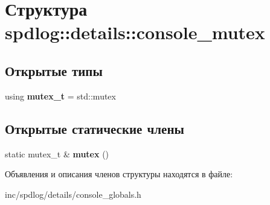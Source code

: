 \hypertarget{structspdlog_1_1details_1_1console__mutex}{}\section{Структура spdlog\+:\+:details\+:\+:console\+\_\+mutex}
\label{structspdlog_1_1details_1_1console__mutex}
\subsection*{Открытые типы}
\begin{DoxyCompactItemize}
\item 
\mbox{\label{structspdlog_1_1details_1_1console__mutex_a8c47cc70b6f1c3c7ddda2f919e4fae53}} 
using {\bfseries mutex\+\_\+t} = std\+::mutex
\end{DoxyCompactItemize}
\subsection*{Открытые статические члены}
\begin{DoxyCompactItemize}
\item 
\mbox{\label{structspdlog_1_1details_1_1console__mutex_a0eca5de786748bdfe509966a54b4d32f}} 
static mutex\+\_\+t \& {\bfseries mutex} ()
\end{DoxyCompactItemize}


Объявления и описания членов структуры находятся в файле\+:\begin{DoxyCompactItemize}
\item 
inc/spdlog/details/console\+\_\+globals.\+h\end{DoxyCompactItemize}
